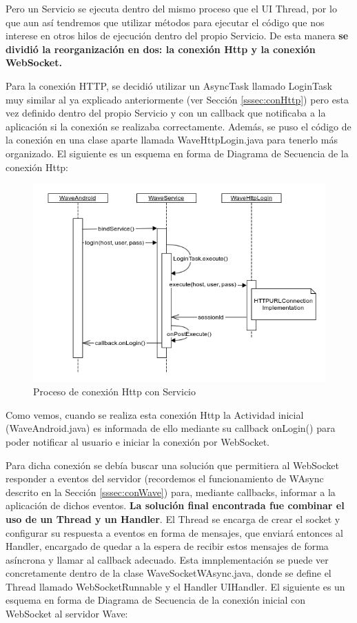     Pero un Servicio se ejecuta dentro del mismo proceso que el UI Thread, por lo que aun así tendremos que utilizar métodos para ejecutar el código que nos interese en otros hilos de ejecución dentro del propio Servicio. De esta manera \textbf{se dividió la reorganización en dos: la conexión Http y la conexión WebSocket.}
    
    Para la conexión HTTP, se decidió utilizar un AsyncTask llamado LoginTask muy similar al ya explicado anteriormente (ver Sección \ref{sssec:conHttp}) pero esta vez definido dentro del propio Servicio y con un callback que notificaba a la aplicación si la conexión se realizaba correctamente. Además, se puso el código de la conexión en una clase aparte llamada WaveHttpLogin.java para tenerlo más organizado. El siguiente es un esquema en forma de Diagrama de Secuencia de la conexión Http:
    
  \begin{figure}[H]
   \centering
	\includegraphics[keepaspectratio, scale=0.6]{Media/Diagrams/loginHttpSequenceDiagram.png}
    \caption{Proceso de conexión Http con Servicio}
   \label{fig:sequenceDiagram_waveHttp}
  \end{figure}
    
    Como vemos, cuando se realiza esta conexión Http la Actividad inicial (WaveAndroid.java) es informada de ello mediante su callback onLogin() para poder notificar al usuario e iniciar la conexión por WebSocket. 
    
    Para dicha conexión se debía buscar una solución que permitiera al WebSocket responder a eventos del servidor (recordemos el funcionamiento de WAsync descrito en la Sección \ref{sssec:conWave}) para, mediante callbacks, informar a la aplicación de dichos eventos. \textbf{La solución final encontrada fue combinar el uso de un Thread y un Handler}. El Thread se encarga de crear el socket y configurar su respuesta a eventos en forma de mensajes, que enviará entonces al Handler, encargado de quedar a la espera de recibir estos mensajes de forma asíncrona y llamar al callback adecuado. Esta imnplementación se puede ver concretamente dentro de la clase WaveSocketWAsync.java, donde se define el Thread llamado WebSocketRunnable y el Handler UIHandler. El siguiente es un esquema en forma de Diagrama de Secuencia de la conexión inicial con WebSocket al servidor Wave:
    
